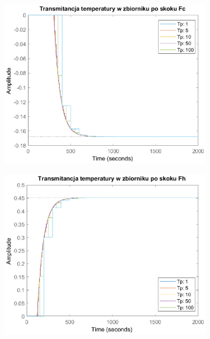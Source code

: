 \begin{figure}[h!]
   \centering
   \begin{subfigure}[b]{0.6\textwidth}
      \includegraphics[width=1\linewidth]{img/transforms/transformTFc.eps}
      \caption{}
      \label{fig:fig:transformTF1}
   \end{subfigure}
       
   \begin{subfigure}[b]{0.6\textwidth}
      \includegraphics[width=1\linewidth]{img/transforms/transformTFh.eps}
      \caption{}
      \label{fig:fig:transformTF2}
   \end{subfigure}
       

\end{figure}
